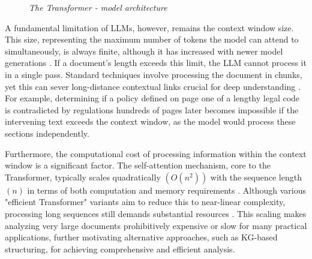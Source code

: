 \begin{figure}[H]
\caption{\textit{The Transformer - model architecture}}
\label{fig:transformer}
\end{figure}

A fundamental limitation of LLMs, however, remains the context window size. This size, representing the maximum number of tokens the model can attend to simultaneously, is always finite, although it has increased with newer model generations \parencite{RefWorks:RefID:115-ratner2022parallel,RefWorks:RefID:100-kaplan2020scaling,RefWorks:RefID:99-liu2025comprehensive}. If a document's length exceeds this limit, the LLM cannot process it in a single pass. Standard techniques involve processing the document in chunks, yet this can sever long-distance contextual links crucial for deep understanding \parencite{RefWorks:RefID:105-chen2024dense}. For example, determining if a policy defined on page one of a lengthy legal code is contradicted by regulations hundreds of pages later becomes impossible if the intervening text exceeds the context window, as the model would process these sections independently.

Furthermore, the computational cost of processing information within the context window is a significant factor. The self-attention mechanism, core to the Transformer, typically scales quadratically $(O(n^2))$ with the sequence length $(n)$ in terms of both computation and memory requirements \parencite{RefWorks:RefID:81-vaswani2017attention}. Although various "efficient Transformer" variants aim to reduce this to near-linear complexity, processing long sequences still demands substantial resources \parencite{RefWorks:RefID:106-tay2023efficient}. This scaling makes analyzing very large documents prohibitively expensive or slow for many practical applications, further motivating alternative approaches, such as KG-based structuring, for achieving comprehensive and efficient analysis.

